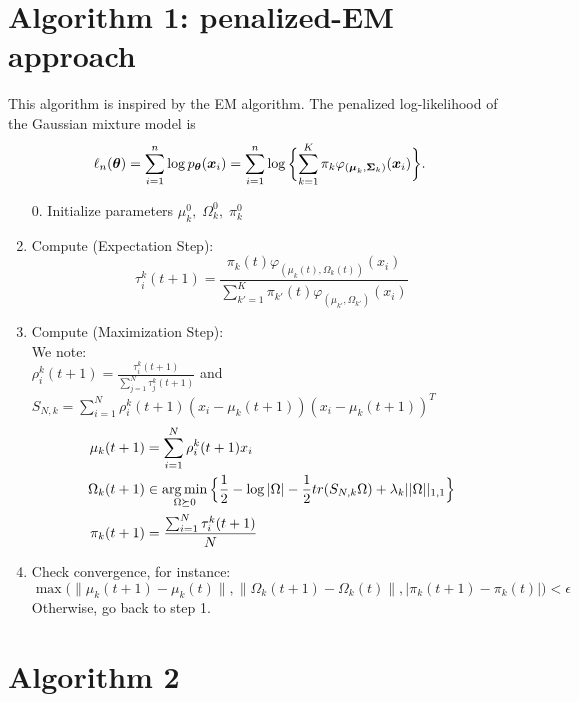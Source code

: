\section{Algorithm 1: penalized-EM approach}
This algorithm is inspired by the EM algorithm. The penalized log-likelihood of the Gaussian mixture model is
\begin{equation}\label{log-likelihood}
\ell_n({\boldsymbol\theta})=\sum_{i=1}^{n}\log{p_{{\boldsymbol\theta}}(\boldsymbol x_i)}=
\sum_{i=1}^{n}\log\bigg\{{\sum_{k=1}^K\pi_k\varphi_{(\boldsymbol\mu_{k},\boldsymbol\Sigma_{k})}(\boldsymbol x_i)}\bigg\}.
\end{equation}

\begin{enumerate}
\item[0.] Initialize parameters $\mu_k^0,\; \Omega_k^0,\;\pi_k^0$
\item Compute (Expectation Step):
\begin{equation}
\label{posteriorEM}
\tau_i^k(t+1)=\frac{\pi_k(t) \varphi_{(\mu_k(t),\Omega_k(t))}(x_i)}{\sum_{k'=1}^K\pi_{k'}(t)\varphi_{(\mu_{k'},\Omega_{k'})}(x_i)}
\end{equation}

\item Compute (Maximization Step):\\

We note:
\\$\rho^k_i(t+1)=\frac{\tau_i^k(t+1)}{\sum_{j=1}^N\tau_j^k(t+1)}$ and\\
$S_{N,k}=\sum_{i=1}^N \rho^k_i(t+1) (x_i-\mu_k(t+1))(x_i-\mu_k(t+1))^T$\\

\begin{align}
\mu_k(t+1)&=\sum_{i=1}^N \rho^k_i(t+1) x_i\\
\Omega_k(t+1) & \in \operatorname*{arg\,min}_{ \Omega\succeq 0} \Big\{ \frac{1}{2}-\log| \Omega |-\frac{1}{2} tr(S_{N,k}\Omega)+\lambda_k||\Omega||_{1,1}\Big\}\\
\pi_k(t+1)&=\frac{\sum_{i=1}^N\tau_i^k(t+1)}{N}
\end{align}
\item Check convergence, for instance:\\
$\max\Big(\|\mu_k(t+1)-\mu_k(t)\|,\|\Omega_k(t+1)-\Omega_k(t)\|,|\pi_k(t+1)-\pi_k(t)|\Big)<\epsilon$
Otherwise, go back to step 1.
\end{enumerate}

\section{Algorithm 2}

